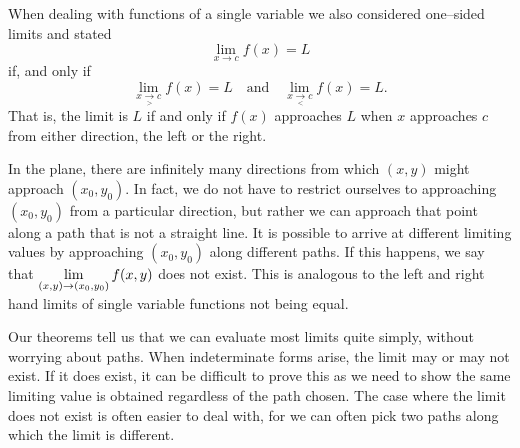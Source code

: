 When dealing with functions of a single variable we also considered one--sided limits and stated
$$\lim_{x\to c}f(x) = L$$
if, and only if
$$
\lim_{x\underset{>}{\rightarrow}c}f(x) =L \quad \mbox{and}\quad \lim_{x\underset{<}{\rightarrow}c}f(x) =L.
$$
That is, the limit is $L$ if and only if $f(x)$ approaches $L$ when $x$ approaches $c$ from either direction, the left or the right.

In the plane, there are infinitely many directions from which $(x,y)$ might approach $(x_0,y_0)$. In fact, we do not have to restrict ourselves to approaching $(x_0,y_0)$ from a particular direction, but rather we can approach that point along a path that is not a straight line. It is possible to arrive at different limiting values by approaching $(x_0,y_0)$ along different paths. If this happens, we say that $\displaystyle \lim_{(x,y)\to(x_0,y_0) } f(x,y)$ does not exist. This is analogous to the left and right hand limits of single variable functions not being equal.

Our theorems tell us that we can evaluate most limits quite simply, without worrying about  paths. When indeterminate forms arise, the limit may or may not exist. If it does exist, it can be difficult to prove this as we need to show the same limiting value is obtained regardless of the path chosen. The case where the limit does not exist is often easier to deal with, for we can often pick two paths along which the limit is different.

